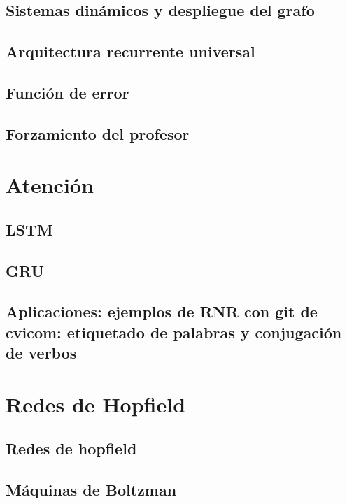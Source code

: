 \documentclass[12pt,openany]{book}
\begin{document}
\section{Sistemas dinámicos y despliegue del grafo}
\section{Arquitectura recurrente universal}
\section{Función de error}
\section{Forzamiento del profesor}

\chapter{Atención}%
\section{LSTM}
\section{GRU}
\section{Aplicaciones: ejemplos de RNR con git de cvicom: etiquetado de palabras y conjugación de verbos}

\chapter{Redes de Hopfield}
\section{Redes de hopfield}
\section{Máquinas de Boltzman}

\end{document}
